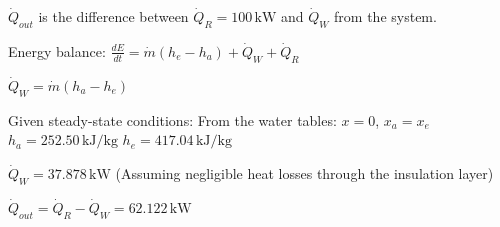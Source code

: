 \( \dot{Q}_{out} \) is the difference between \( \dot{Q}_R = 100 \, \text{kW} \) and \( \dot{Q}_W \) from the system.  

Energy balance:  
\( \frac{dE}{dt} = \dot{m} (h_e - h_a) + \dot{Q}_W + \dot{Q}_R \)  

\( \dot{Q}_W = \dot{m} (h_a - h_e) \)  

Given steady-state conditions:  
From the water tables: \( x = 0 \), \( x_a = x_e \)  
\( h_a = 252.50 \, \text{kJ/kg} \)  
\( h_e = 417.04 \, \text{kJ/kg} \)  

\( \dot{Q}_W = 37.878 \, \text{kW} \)  
(Assuming negligible heat losses through the insulation layer)  

\( \dot{Q}_{out} = \dot{Q}_R - \dot{Q}_W = 62.122 \, \text{kW} \)